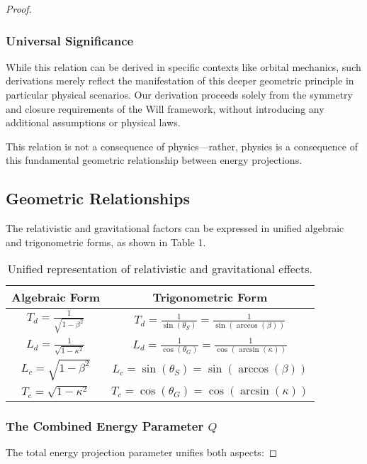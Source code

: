\documentclass{article}
\begin{document}
\begin{proof}
\subsubsection{Universal Significance}

While this relation can be derived in specific contexts like orbital mechanics, such derivations merely reflect the manifestation of this deeper geometric principle in particular physical scenarios. Our derivation proceeds solely from the symmetry and closure requirements of the Will framework, without introducing any additional assumptions or physical laws.

This relation is not a consequence of physics—rather, physics is a consequence of this fundamental geometric relationship between energy projections.

\subsection{Geometric Relationships}

The relativistic and gravitational factors can be expressed in unified algebraic and trigonometric forms, as shown in Table 1.

\begin{table}[h]
\centering
\begin{tabular}{|c|c|}
\hline
\textbf{Algebraic Form} & \textbf{Trigonometric Form} \\
\hline
$T_d = \frac{1}{\sqrt{1-\beta^2}}$ & $T_d = \frac{1}{\sin(\theta_S)} = \frac{1}{\sin(\arccos(\beta))}$ \\
\hline
$L_d = \frac{1}{\sqrt{1-\kappa^2}}$ & $L_d = \frac{1}{\cos(\theta_G)} = \frac{1}{\cos(\arcsin(\kappa))}$ \\
\hline
$L_c = \sqrt{1-\beta^2}$ & $L_c = \sin(\theta_S) = \sin(\arccos(\beta))$ \\
\hline
$T_c = \sqrt{1-\kappa^2}$ & $T_c = \cos(\theta_G) = \cos(\arcsin(\kappa))$ \\
\hline
\end{tabular}
\caption{Unified representation of relativistic and gravitational effects.}
\end{table}

\subsubsection{The Combined Energy Parameter $Q$}

The total energy projection parameter unifies both aspects:


\end{proof}
\end{document}
